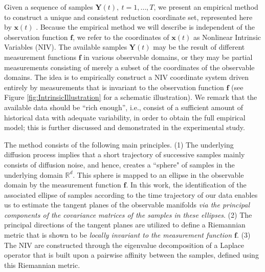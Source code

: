 Given a sequence of samples $\mathbf{Y}(t), \ t=1,\ldots,T$, we present an empirical method to construct a unique and consistent reduction coordinate set, represented here by $\mathbf{x}(t)$ \cite{singer2008non}.
%
Because the empirical method we will describe is independent of the observation function $\mathbf{f}$,
we refer to the coordinates of $\mathbf{x}(t)$ as Nonlinear Intrinsic Variables (NIV).
%
The available samples $\mathbf{Y}(t)$ may be the result of different measurement functions $\mathbf{f}$ in various observable domains,
or they may be partial measurements consisting of merely a subset of the coordinates of the observable domains.
%
The idea is to empirically construct a NIV coordinate system driven entirely by measurements that is invariant to the observation function $\mathbf{f}$
(see Figure \ref{fig:IntrinsicIllustration} for a schematic illustration).
%
We remark that the available data should be ``rich enough'', i.e., consist of a sufficient amount of historical data with adequate variability, in order to obtain the full empirical model;
this is further discussed and demonstrated in the experimental study.

The method consists of the following main principles.
%
(1) The underlying diffusion process implies that a short trajectory of successive samples mainly consists of diffusion noise,
and hence, creates a ``sphere" of samples in the underlying domain $\mathbb{R}^d$.
%
This sphere is mapped to an ellipse in the observable domain by the measurement function $\mathbf{f}$.
%
In this work, the identification of the associated ellipse of samples according to the time trajectory of our data enables us
to estimate the tangent planes of the observable manifolds {\em via the principal components of the covariance matrices of the samples in these ellipses}.
%
(2) The principal directions of the tangent planes are utilized to define a Riemannian metric that is shown to be {\em locally invariant to the measurement function $\mathbf{f}$}.
%
(3) The NIV are constructed through the eigenvalue decomposition of a Laplace operator that is built upon a pairwise affinity between the samples, defined using this Riemannian metric.

